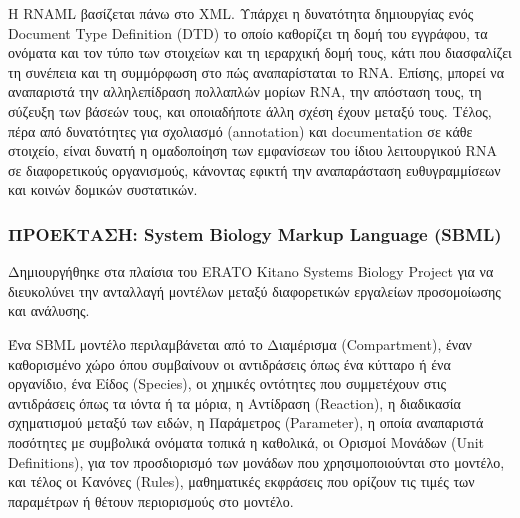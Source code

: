             Η RNAML βασίζεται πάνω στο XML.
            Υπάρχει η δυνατότητα δημιουργίας ενός Document Type Definition (DTD) το οποίο καθορίζει τη δομή του εγγράφου, τα ονόματα και τον τύπο των στοιχείων και τη ιεραρχική δομή τους,
                κάτι που διασφαλίζει τη συνέπεια και τη συμμόρφωση στο πώς αναπαρίσταται το RNA.
            Επίσης, μπορεί να αναπαριστά την αλληλεπίδραση πολλαπλών μορίων RNA, την απόσταση τους, τη σύζευξη των βάσεών τους, και οποιαδήποτε άλλη σχέση έχουν μεταξύ τους.
            Τέλος, πέρα από δυνατότητες για σχολιασμό (annotation) και documentation σε κάθε στοιχείο, είναι δυνατή η ομαδοποίηση των εμφανίσεων του ίδιου λειτουργικού RNA σε διαφορετικούς οργανισμούς,
                κάνοντας εφικτή την αναπαράσταση ευθυγραμμίσεων και κοινών δομικών συστατικών.

        \subsubsection{ΠΡΟΕΚΤΑΣΗ: System Biology Markup Language (SBML)}
            Δημιουργήθηκε στα πλαίσια του ERATO Kitano Systems Biology Project για να διευκολύνει την ανταλλαγή μοντέλων μεταξύ διαφορετικών εργαλείων προσομοίωσης και ανάλυσης. \cite{SBML}

            Ένα SBML μοντέλο περιλαμβάνεται από το Διαμέρισμα (Compartment), έναν καθορισμένο χώρο όπου συμβαίνουν οι αντιδράσεις όπως ένα κύτταρο ή ένα οργανίδιο,
                ένα Eίδος (Species), οι χημικές οντότητες που συμμετέχουν στις αντιδράσεις όπως τα ιόντα ή τα μόρια, η Αντίδραση (Reaction), η διαδικασία σχηματισμού μεταξύ των ειδών,
                η Παράμετρος (Parameter), η οποία αναπαριστά ποσότητες με συμβολικά ονόματα τοπικά η καθολικά, οι Ορισμοί Μονάδων (Unit Definitions), για τον προσδιορισμό των μονάδων που χρησιμοποιούνται στο μοντέλο,
                και τέλος οι Κανόνες (Rules), μαθηματικές εκφράσεις που ορίζουν τις τιμές των παραμέτρων ή θέτουν περιορισμούς στο μοντέλο.

